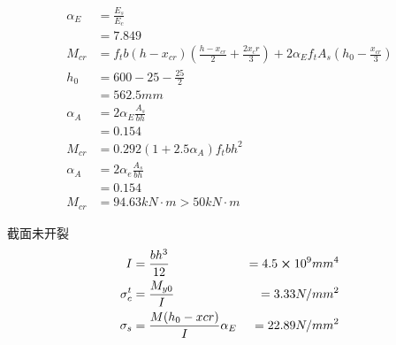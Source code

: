 \documentclass{article}
\begin{document}
\begin{questionList}
\begin{enumerate}
\begin{enumerate}
                              \begin{align*}
                                    \alpha_E & =\frac{E_s}{E_c}                                                                          \\
                                             & =7.849                                                                                    \\
                                    M_{cr}   & =f_tb(h-x_{cr})(\frac{h-x_{cr}}{2}+\frac{2x_cr}{3})+2\alpha_Ef_tA_s(h_0-\frac{x_{cr}}{3}) \\
                                    h_0      & =600-25-\frac{25}{2}                                                                      \\
                                             & =562.5mm                                                                                  \\
                                    \alpha_A & =2\alpha_E\frac{A_s}{bh}                                                                  \\
                                             & =0.154                                                                                    \\
                                    M_{cr}   & =0.292(1+2.5\alpha_A)f_tbh^2                                                              \\
                                    \alpha_A & =2\alpha_e\frac{A_s}{bh}                                                                  \\
                                             & =0.154                                                                                    \\
                                    M_{cr}   & =94.63kN\cdot m >50kN\cdot m
                              \end{align*}
                              \par 截面未开裂
                              \begin{align*}
                                    I          & =\frac{bh^3}{12}                   & =4.5\cross10^9mm^4       \\
                                    \sigma_c^t & =\frac{M_{y0}}{I}                  & =3.33N/mm^2              \\
                                    \sigma_s   & =\frac{M(h_0-x{cr})}{I}\alpha_E    & =22.89N/mm^2             \\

\end{align*}
\end{enumerate}
\end{enumerate}
\end{questionList}
\end{document}
